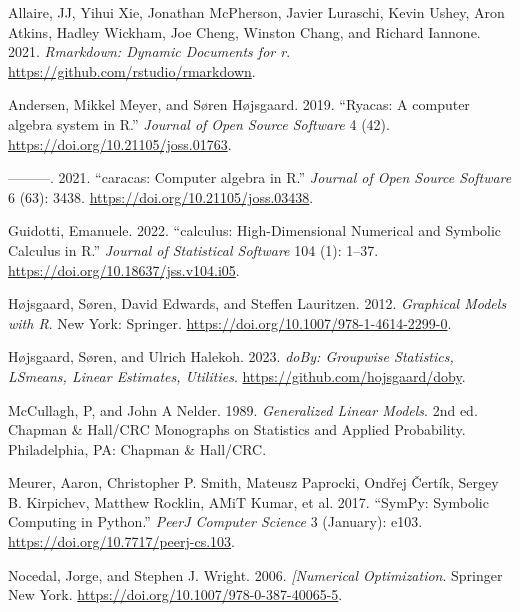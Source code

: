 \hypertarget{refs}{}
\begin{CSLReferences}{1}{0}
\leavevmode{}%
Allaire, JJ, Yihui Xie, Jonathan McPherson, Javier Luraschi, Kevin Ushey, Aron Atkins, Hadley Wickham, Joe Cheng, Winston Chang, and Richard Iannone. 2021. \emph{Rmarkdown: Dynamic Documents for r}. \url{https://github.com/rstudio/rmarkdown}.

\leavevmode{}%
Andersen, Mikkel Meyer, and Søren Højsgaard. 2019. {``{Ryacas: A computer algebra system in R}.''} \emph{Journal of Open Source Software} 4 (42). \url{https://doi.org/10.21105/joss.01763}.

\leavevmode{}%
---------. 2021. {``{caracas: Computer algebra in R}.''} \emph{Journal of Open Source Software} 6 (63): 3438. \url{https://doi.org/10.21105/joss.03438}.

\leavevmode{}%
Guidotti, Emanuele. 2022. {``{calculus: High-Dimensional Numerical and Symbolic Calculus in R}.''} \emph{Journal of Statistical Software} 104 (1): 1--37. \url{https://doi.org/10.18637/jss.v104.i05}.

\leavevmode{}%
Højsgaard, Søren, David Edwards, and Steffen Lauritzen. 2012. \emph{Graphical Models with {R}}. New York: Springer. \url{https://doi.org/10.1007/978-1-4614-2299-0}.

\leavevmode{}%
Højsgaard, Søren, and Ulrich Halekoh. 2023. \emph{{doBy: Groupwise Statistics, LSmeans, Linear Estimates, Utilities}}. \url{https://github.com/hojsgaard/doby}.

\leavevmode{}%
McCullagh, P, and John A Nelder. 1989. \emph{{Generalized Linear Models}}. 2nd ed. Chapman \& Hall/CRC Monographs on Statistics and Applied Probability. Philadelphia, PA: Chapman \& Hall/CRC.

\leavevmode{}%
Meurer, Aaron, Christopher P. Smith, Mateusz Paprocki, Ondřej Čertík, Sergey B. Kirpichev, Matthew Rocklin, AMiT Kumar, et al. 2017. {``SymPy: Symbolic Computing in Python.''} \emph{PeerJ Computer Science} 3 (January): e103. \url{https://doi.org/10.7717/peerj-cs.103}.

\leavevmode{}%
Nocedal, Jorge, and Stephen J. Wright. 2006. \emph{{[}Numerical Optimization}. Springer New York. \url{https://doi.org/10.1007/978-0-387-40065-5}.


\end{CSLReferences}
